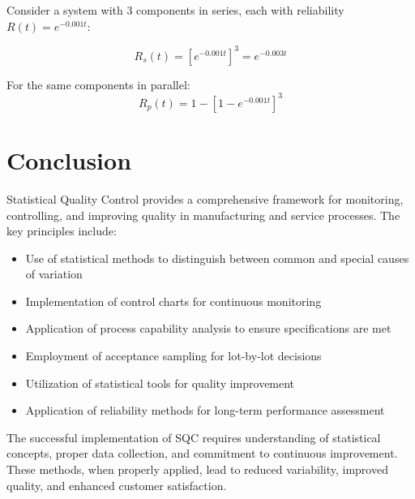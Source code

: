 \documentclass[twoside]{book}
\begin{document}
Consider a system with 3 components in series, each with reliability $R(t) = e^{-0.001t}$:

$$R_s(t) = [e^{-0.001t}]^3 = e^{-0.003t}$$

For the same components in parallel:
$$R_p(t) = 1 - [1 - e^{-0.001t}]^3$$

\begin{figure}[H]
\centering
{}
\end{figure}

\section{Conclusion}

Statistical Quality Control provides a comprehensive framework for monitoring, controlling, and improving quality in manufacturing and service processes. The key principles include:

\begin{itemize}
    \item Use of statistical methods to distinguish between common and special causes of variation
    \item Implementation of control charts for continuous monitoring
    \item Application of process capability analysis to ensure specifications are met
    \item Employment of acceptance sampling for lot-by-lot decisions
    \item Utilization of statistical tools for quality improvement
    \item Application of reliability methods for long-term performance assessment
\end{itemize}

The successful implementation of SQC requires understanding of statistical concepts, proper data collection, and commitment to continuous improvement. These methods, when properly applied, lead to reduced variability, improved quality, and enhanced customer satisfaction.
\end{document}
